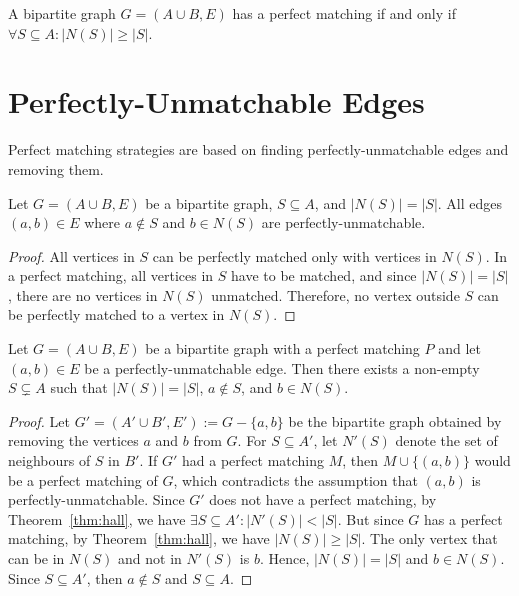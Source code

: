\begin{thm}\label{thm:hall}
    A bipartite graph $G = (A \cup B, E)$ has a perfect matching if and only if
    $\forall S \subseteq A: \left|N(S)\right| \geq \left|S\right|$. \cite{hall1935}
\end{thm}

\section{Perfectly-Unmatchable Edges}

Perfect matching strategies are based on finding perfectly-unmatchable edges and removing them.

\begin{thm}\label{thm:strategy}
    Let $G = (A \cup B, E)$ be a bipartite graph, $S \subseteq A$, and $\left|N(S)\right| = \left|S\right|$.
    All edges $(a, b) \in E$ where $a \notin S$ and $b \in N(S)$ are perfectly-unmatchable.
\end{thm}

\begin{proof}
    All vertices in $S$ can be perfectly matched only with vertices in $N(S)$.
    In a perfect matching, all vertices in $S$ have to be matched, and
    since $\left|N(S)\right| = \left|S\right|$, there are no vertices in $N(S)$ unmatched.
    Therefore, no vertex outside $S$ can be perfectly matched to a vertex in $N(S)$.
\end{proof}

\begin{thm}\label{thm:existence}
    Let $G = (A \cup B, E)$ be a bipartite graph with
    a perfect matching $P$ and let $(a, b) \in E$ be a perfectly-unmatchable edge.
    Then there exists a non-empty $S \subsetneq A$ such that $\left|N(S)\right| = \left|S\right|$,
    $a \notin S$, and $b \in N(S)$.
\end{thm}

\begin{proof}
    Let $G' = (A' \cup B', E') := G - \{a, b\}$
    be the bipartite graph obtained by removing the vertices $a$ and $b$ from $G$.
    For $S \subseteq A'$, let $N'(S)$ denote the set of neighbours of $S$ in $B'$.
    If $G'$ had a perfect matching $M$, then $M \cup \{(a, b)\}$ would be a perfect matching of $G$,
    which contradicts the assumption that $(a, b)$ is perfectly-unmatchable.
    Since $G'$ does not have a perfect matching, by Theorem~\ref{thm:hall},
    we have $\exists S \subseteq A': \left|N'(S)\right| < \left|S\right|$.
    But since $G$ has a perfect matching, by Theorem~\ref{thm:hall}, we have $\left|N(S)\right| \geq \left|S\right|$.
    The only vertex that can be in $N(S)$ and not in $N'(S)$ is $b$.
    Hence, $\left|N(S)\right| = \left|S\right|$ and $b \in N(S)$.
    Since $S \subseteq A'$, then $a \notin S$ and $S \subseteq A$.
\end{proof}

